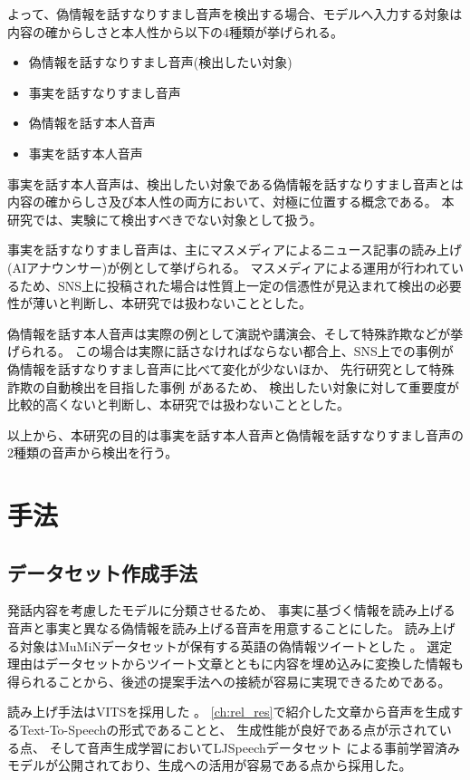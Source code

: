 よって、偽情報を話すなりすまし音声を検出する場合、モデルへ入力する対象は内容の確からしさと本人性から以下の4種類が挙げられる。

\begin{itemize}
    \item 偽情報を話すなりすまし音声(検出したい対象)
    \item 事実を話すなりすまし音声
    \item 偽情報を話す本人音声
    \item 事実を話す本人音声
\end{itemize}

事実を話す本人音声は、検出したい対象である偽情報を話すなりすまし音声とは内容の確からしさ及び本人性の両方において、対極に位置する概念である。
本研究では、実験にて検出すべきでない対象として扱う。

事実を話すなりすまし音声は、主にマスメディアによるニュース記事の読み上げ(AIアナウンサー)が例として挙げられる\cite{nhk2020,nhkAnnual2020}。
マスメディアによる運用が行われているため、SNS上に投稿された場合は性質上一定の信憑性が見込まれて検出の必要性が薄いと判断し、本研究では扱わないこととした。

偽情報を話す本人音声は実際の例として演説や講演会、そして特殊詐欺などが挙げられる。
この場合は実際に話さなければならない都合上、SNS上での事例が偽情報を話すなりすまし音声に比べて変化が少ないほか、
先行研究として特殊詐欺の自動検出を目指した事例 \cite{近野恵2023}があるため、
検出したい対象に対して重要度が比較的高くないと判断し、本研究では扱わないこととした。

以上から、本研究の目的は事実を話す本人音声と偽情報を話すなりすまし音声の2種類の音声から検出を行う。

\section{手法}\label{sec:cnt_mtd}
\subsection{データセット作成手法}\label{ssc:spc_ds}
発話内容を考慮したモデルに分類させるため、
事実に基づく情報を読み上げる音声と事実と異なる偽情報を読み上げる音声を用意することにした。
読み上げる対象はMuMiNデータセットが保有する英語の偽情報ツイートとした \cite{10.1145/3477495.3531744}。
選定理由はデータセットからツイート文章とともに内容を埋め込みに変換した情報も得られることから、後述の提案手法への接続が容易に実現できるためである。

読み上げ手法はVITSを採用した \cite{pmlr-v139-kim21f}。
\cref{ch:rel_res}で紹介した文章から音声を生成するText-To-Speechの形式であることと、
生成性能が良好である点が示されている点、
そして音声生成学習においてLJSpeechデータセット \cite{ljspeech17}による事前学習済みモデルが公開されており、生成への活用が容易である点から採用した。

